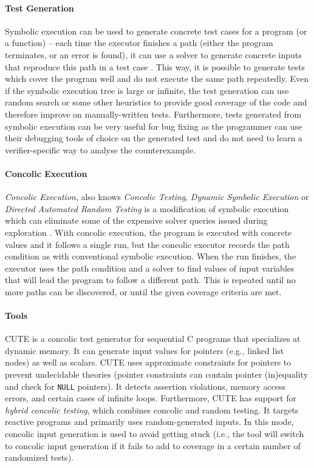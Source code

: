 \paragraph{Test Generation}

Symbolic execution can be used to generate concrete test cases for a program (or a function) -- each time the executor finishes a path (either the program terminates, or an error is found), it can use a solver to generate concrete inputs that reproduce this path in a test case .
This way, it is possible to generate tests which cover the program well and do not execute the same path repeatedly.
Even if the symbolic execution tree is large or infinite, the test generation can use random search or some other heuristics to provide good coverage of the code and therefore improve on manually-written tests.
Furthermore, tests generated from symbolic execution can be very useful for bug fixing as the programmer can use their debugging tools of choice on the generated test and do not need to learn a verifier-specific way to analyse the counterexample.

\paragraph{Concolic Execution}

\emph{Concolic Execution}, also knows \emph{Concolic Testing}, \emph{Dynamic Symbolic Execution} or \emph{Directed Automated Random Testing} is a modification of symbolic execution which can eliminate some of the expensive solver queries issued during exploration .
With concolic execution, the program is executed with concrete values and it follows a single run, but the concolic executor records the path condition as with conventional symbolic execution.
When the run finishes, the executor uses the path condition and a solver to find values of input variables that will lead the program to follow a different path.
This is repeated until no more paths can be discovered, or until the given coverage criteria are met.

\paragraph{Tools}

CUTE  is a concolic test generator for sequential C programs that specializes at dynamic memory.
It can generate input values for pointers (e.g., linked list nodes) as well as scalars.
CUTE uses approximate constraints for pointers to prevent undecidable theories (pointer constraints can contain pointer (in)equality and check for \texttt{NULL} pointers).
It detects assertion violations, memory access errors, and certain cases of infinite loops.
Furthermore, CUTE has support for \emph{hybrid concolic testing}, which combines concolic and random testing.
It targets reactive programs and primarily uses random-generated inputs.
In this mode, concolic input generation is used to avoid getting stuck (i.e., the tool will switch to concolic input generation if it fails to add to coverage in a certain number of randomized tests).

